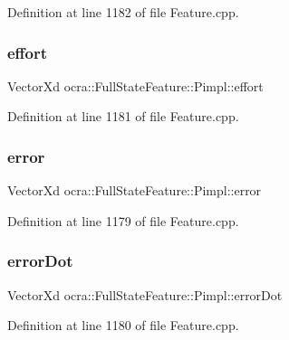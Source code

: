 Definition at line 1182 of file Feature.\+cpp.

\hypertarget{structocra_1_1FullStateFeature_1_1Pimpl_a7e2566a7756280de4327e405cab53956}{}\label{structocra_1_1FullStateFeature_1_1Pimpl_a7e2566a7756280de4327e405cab53956} 
\subsubsection{\texorpdfstring{effort}{effort}}
{\footnotesize\ttfamily Vector\+Xd ocra\+::\+Full\+State\+Feature\+::\+Pimpl\+::effort}



Definition at line 1181 of file Feature.\+cpp.

\hypertarget{structocra_1_1FullStateFeature_1_1Pimpl_a37accc4269498c113d450b0106115274}{}\label{structocra_1_1FullStateFeature_1_1Pimpl_a37accc4269498c113d450b0106115274} 
\subsubsection{\texorpdfstring{error}{error}}
{\footnotesize\ttfamily Vector\+Xd ocra\+::\+Full\+State\+Feature\+::\+Pimpl\+::error}



Definition at line 1179 of file Feature.\+cpp.

\hypertarget{structocra_1_1FullStateFeature_1_1Pimpl_aea594214dbcf9bd9c7fb28b16593df7e}{}\label{structocra_1_1FullStateFeature_1_1Pimpl_aea594214dbcf9bd9c7fb28b16593df7e} 
\subsubsection{\texorpdfstring{error\+Dot}{errorDot}}
{\footnotesize\ttfamily Vector\+Xd ocra\+::\+Full\+State\+Feature\+::\+Pimpl\+::error\+Dot}



Definition at line 1180 of file Feature.\+cpp.

